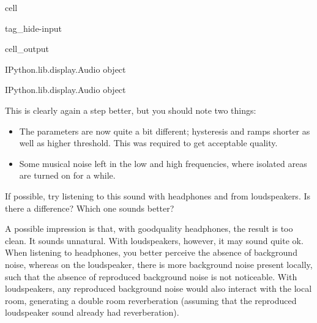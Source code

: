 \documentclass[letterpaper,10pt,english]{jupyterBook}
\begin{document}
\begin{sphinxuseclass}{cell}
\begin{sphinxuseclass}{tag_hide-input}\begin{sphinxVerbatimOutput}

\begin{sphinxuseclass}{cell_output}
\begin{sphinxVerbatim}[commandchars=\\\{\}]
\PYGZlt{}IPython.lib.display.Audio object\PYGZgt{}
\end{sphinxVerbatim}

\noindent{}

\begin{sphinxVerbatim}[commandchars=\\\{\}]
\PYGZlt{}IPython.lib.display.Audio object\PYGZgt{}
\end{sphinxVerbatim}

\end{sphinxuseclass}\end{sphinxVerbatimOutput}

\end{sphinxuseclass}
\end{sphinxuseclass}
\sphinxAtStartPar
This is clearly again a step better, but you should note two things:
\begin{itemize}
\item {} 
\sphinxAtStartPar
The parameters are now quite a bit different; hysteresis and ramps shorter as well as higher threshold. This was required to get acceptable quality.

\item {} 
\sphinxAtStartPar
Some musical noise left in the low and high frequencies, where isolated areas are turned on for a while.

\end{itemize}

\sphinxAtStartPar
If possible, try listening to this sound with headphones and from loudspeakers. Is there a difference? Which one sounds better?

\sphinxAtStartPar
A possible impression is that, with good\sphinxhyphen{}quality headphones, the result is too clean. It sounds unnatural. With loudspeakers, however, it may sound quite ok. When listening to headphones, you better perceive the absence of background noise, whereas on the loudspeaker, there is more background noise present locally, such that the absence of reproduced background noise is not noticeable. With loudspeakers, any reproduced background noise would also interact with the local room, generating a double room reverberation (assuming that the reproduced loudspeaker sound already had reverberation).
\end{document}
